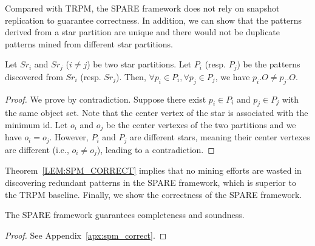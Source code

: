 Compared with TRPM, the SPARE framework does not rely on snapshot replication to guarantee correctness. In addition, we can show that the patterns derived from a star partition are unique and there would not be duplicate patterns mined from different star partitions.
\begin{theorem}
\label{LEM:SPM_CORRECT}
Let $Sr_i$ and $Sr_j$ ($i\neq j$) be two star partitions. Let $P_i$ (resp. $P_j$) be 
the patterns discovered from $Sr_i$ (resp. $Sr_j$). 
Then, $\forall p_i \in P_i, \forall p_j \in P_j$, we have $p_i.O \neq p_j.O$.
\end{theorem}
\begin{proof}
We prove by contradiction. Suppose there exist $p_i \in P_i$ and $p_j \in P_j$ with the same object set. Note that the center vertex of the star is associated with the minimum id. Let $o_i$ and $o_j$ be the center vertexes of the two partitions and we have $o_i=o_j$. However, $P_i$ and $P_j$ are different stars, meaning their center vertexes are different (i.e., $o_i\neq o_j$), leading to a contradiction. 
\end{proof}

Theorem~\ref{LEM:SPM_CORRECT} implies that no mining efforts are wasted in discovering redundant patterns  
in the SPARE framework, which is superior to the TRPM baseline. Finally, we show the correctness of the SPARE framework.
\begin{theorem}
\label{THM:SPM_CORRECT}
The SPARE framework guarantees completeness and soundness.
\end{theorem}
\vspace{-5 mm}
\begin{proof}
See Appendix~\ref{apx:spm_correct}.
\end{proof}
